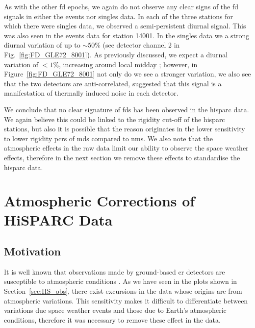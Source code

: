 As with the other \gls{fd} epochs, we again do not observe any clear signs of the \gls{fd} signals in either the events nor singles data. In each of the three stations for which there were singles data, we observed a semi-persistent diurnal signal. This was also seen in the events data for station 14001. In the singles data we a strong diurnal variation of up to $\sim 50\%$ (see detector channel 2 in Fig.~\ref{fig:FD_GLE72_8001}). As previously discussed, we expect a diurnal variation of $< 1\%$, increasing around local midday \citep{mishra_study_2007, mishra_cosmic_2008, dubey_cosmic_2016, thomas_decadal_2017}; however, in Figure~\ref{fig:FD_GLE72_8001} not only do we see a stronger variation, we also see that the two detectors are anti-correlated, suggested that this signal is a manifestation of thermally induced noise in each detector.



We conclude that no clear signature of \glspl{fd} has been observed in the \gls{hisparc} data. We again believe this could be linked to the rigidity cut-off of the \gls{hisparc} stations, but also it is possible that the reason originates in the lower sensitivity to lower rigidity \glspl{pcr} of \glspl{md} compared to \glspl{nm}. We also note that the atmospheric effects in the raw data limit our ability to observe the space weather effects, therefore in the next section we remove these effects to standardise the \gls{hisparc} data. 




\section{Atmospheric Corrections of HiSPARC Data}\label{sec:HS_standardisation}

\subsection{Motivation}

It is well known that observations made by ground-based \gls{cr} detectors are susceptible to atmospheric conditions \citep{dorman_theory_2004,dorman_cosmic_2010,berkova_temperature_2011,de_mendonca_analysis_2013,paschalis_online_2013}. As we have seen in the plots shown in Section~\ref{sec:HS_obs}, there exist excursions in the data whose origins are from atmospheric variations. This sensitivity makes it difficult to differentiate between variations due space weather events and those due to Earth's atmospheric conditions, therefore it was necessary to remove these effect in the data.

